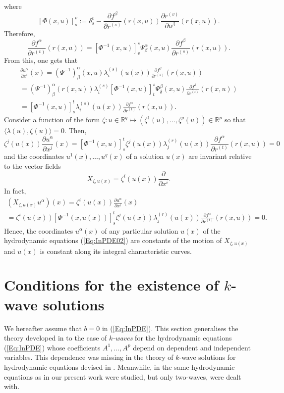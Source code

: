 \documentclass{birkjour}
\theoremstyle{definition}
\theoremstyle{remark}
\numberwithin{equation}{section}
\numberwithin{equation}{section}
\numberwithin{thm}{section}
\numberwithin{equation}{section}
\numberwithin{thm}{section}
\begin{document}
where
$$
[\Phi(x,u)]^v_s:=\delta_s^v-\frac{\partial f^\beta}{\partial r^{(s)}}(r(x,u))\frac{\partial r^{(v)}}{\partial u^\beta}(r(x,u)).
$$
Therefore,
$$
\frac{\partial f^\alpha}{\partial r^{(v)}}(r(x,u))=[\Phi^{-1}(x,u)]^s_v\Psi^\alpha_\beta(x,u)\frac{\partial f^\beta}{\partial r^{(s)}}(r(x,u)).
$$
From this, one gets that
\begin{multline*}
	\frac{\partial u^\alpha}{\partial x^i}(x)=(\Psi^{-1})^\alpha_\beta(x,u)\lambda^{(s)}_i(u(x))\frac{\partial f^\beta}{\partial r^{(s)}}(r(x,u))\\=(\Psi^{-1})^\alpha_\beta(r(x,u))\lambda_i^{(s)}[\Phi^{-1}(x,u)]^s_t\Psi^\beta_\delta(x,u)\frac{\partial f^\delta}{\partial r^{(t)}}(r(x,u))\\=[\Phi^{-1}(x,u)]^t_s\lambda_i^{(s)}(u(x))\frac{\partial f^\alpha}{\partial r^{(t)}}(r(x,u)).
\end{multline*}
Consider a function of the form $\zeta:u\in \mathbb{R}^q\mapsto (\zeta^1(u),\ldots,\zeta^p(u))\in \mathbb{R}^p$ so that $\langle \lambda(u),\zeta(u)\rangle=0$. Then,
$$
\zeta^j(u(x))\frac{\partial u^\alpha}{\partial x^j}(x)=[\Phi^{-1}(x,u)]^t_s\zeta^j(u(x))\lambda_j^{(r)}(u(x))\frac{\partial f^\alpha}{\partial r^{(t)}}(r(x,u))=0
$$
and the coordinates $u^1(x),\ldots,u^q(x)$ of a solution $u(x)$ are invariant relative to the vector fields 
$$
X_{\zeta,u(x)}=\zeta^i(u(x))\frac{\partial}{\partial x^i}.
$$
In fact,
\begin{multline*}
	(X_{\zeta,u(x)} u^\alpha)(x)=\zeta^i(u(x))\frac{\partial u^\alpha}{\partial x^i}(x)\\=\zeta^i(u(x))[\Phi^{-1}(x,u(x))]^t_s\zeta^j(u(x))\lambda_j^{(r)}(u(x))\frac{\partial f^\alpha}{\partial r^{(t)}}(r(x,u))=0. 
\end{multline*}
Hence, the coordinates $u^\alpha(x)$ of any particular solution $u(x)$  of the hydrodynamic equations (\ref{Eq:InPDE02}) are constants of the motion of $X_{\zeta,u(x)}$ and $u(x)$ is constant along its integral characteristic curves. 



\section{Conditions for the existence of  $k$-wave solutions}\label{Se:genkwave}
We hereafter assume that $b=0$ in (\ref{Eq:InPDE}). This section generalises the theory developed in \cite{GL91,GSW00,GV91} to the case of {\it $k$-waves} for the hydrodynamic equations (\ref{Eq:InPDE}) whose coefficients  $A^1,\ldots,A^p$ depend on dependent and independent variables.  This dependence was missing in the theory of $k$-wave solutions  for hydrodynamic equations devised in \cite{GV91}. Meanwhile, in \cite{GL91} the same hydrodynamic equations as in our present work were studied, but only two-waves,  were dealt with. 
\end{document}
